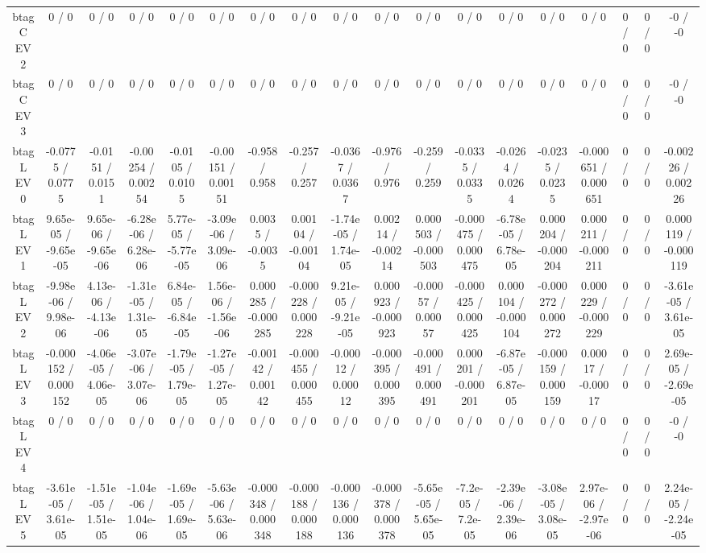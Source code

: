 \documentclass[10pt]{article}
\begin{document}
\begin{table}[htbp]
\begin{center}
\begin{tabular}{|c|c|c|c|c|c|c|c|c|c|c|c|c|c|c|c|c|c|}
  btag C EV 2 & 0 / 0 & 0 / 0 & 0 / 0 & 0 / 0 & 0 / 0 & 0 / 0 & 0 / 0 & 0 / 0 & 0 / 0 & 0 / 0 & 0 / 0 & 0 / 0 & 0 / 0 & 0 / 0 & 0 / 0 & 0 / 0 & -0 / -0 \\ 
  btag C EV 3 & 0 / 0 & 0 / 0 & 0 / 0 & 0 / 0 & 0 / 0 & 0 / 0 & 0 / 0 & 0 / 0 & 0 / 0 & 0 / 0 & 0 / 0 & 0 / 0 & 0 / 0 & 0 / 0 & 0 / 0 & 0 / 0 & -0 / -0 \\ 
  btag L EV 0 & -0.0775 / 0.0775 & -0.0151 / 0.0151 & -0.00254 / 0.00254 & -0.0105 / 0.0105 & -0.00151 / 0.00151 & -0.958 / 0.958 & -0.257 / 0.257 & -0.0367 / 0.0367 & -0.976 / 0.976 & -0.259 / 0.259 & -0.0335 / 0.0335 & -0.0264 / 0.0264 & -0.0235 / 0.0235 & -0.000651 / 0.000651 & 0 / 0 & 0 / 0 & -0.00226 / 0.00226 \\ 
  btag L EV 1 & 9.65e-05 / -9.65e-05 & 9.65e-06 / -9.65e-06 & -6.28e-06 / 6.28e-06 & 5.77e-05 / -5.77e-05 & -3.09e-06 / 3.09e-06 & 0.0035 / -0.0035 & 0.00104 / -0.00104 & -1.74e-05 / 1.74e-05 & 0.00214 / -0.00214 & 0.000503 / -0.000503 & -0.000475 / 0.000475 & -6.78e-05 / 6.78e-05 & 0.000204 / -0.000204 & 0.000211 / -0.000211 & 0 / 0 & 0 / 0 & 0.000119 / -0.000119 \\ 
  btag L EV 2 & -9.98e-06 / 9.98e-06 & 4.13e-06 / -4.13e-06 & -1.31e-05 / 1.31e-05 & 6.84e-05 / -6.84e-05 & 1.56e-06 / -1.56e-06 & 0.000285 / -0.000285 & -0.000228 / 0.000228 & 9.21e-05 / -9.21e-05 & 0.000923 / -0.000923 & -0.00057 / 0.00057 & -0.000425 / 0.000425 & 0.000104 / -0.000104 & -0.000272 / 0.000272 & 0.000229 / -0.000229 & 0 / 0 & 0 / 0 & -3.61e-05 / 3.61e-05 \\ 
  btag L EV 3 & -0.000152 / 0.000152 & -4.06e-05 / 4.06e-05 & -3.07e-06 / 3.07e-06 & -1.79e-05 / 1.79e-05 & -1.27e-05 / 1.27e-05 & -0.00142 / 0.00142 & -0.000455 / 0.000455 & -0.00012 / 0.00012 & -0.000395 / 0.000395 & -0.000491 / 0.000491 & 0.000201 / -0.000201 & -6.87e-05 / 6.87e-05 & -0.000159 / 0.000159 & 0.00017 / -0.00017 & 0 / 0 & 0 / 0 & 2.69e-05 / -2.69e-05 \\ 
  btag L EV 4 & 0 / 0 & 0 / 0 & 0 / 0 & 0 / 0 & 0 / 0 & 0 / 0 & 0 / 0 & 0 / 0 & 0 / 0 & 0 / 0 & 0 / 0 & 0 / 0 & 0 / 0 & 0 / 0 & 0 / 0 & 0 / 0 & -0 / -0 \\ 
  btag L EV 5 & -3.61e-05 / 3.61e-05 & -1.51e-05 / 1.51e-05 & -1.04e-06 / 1.04e-06 & -1.69e-05 / 1.69e-05 & -5.63e-06 / 5.63e-06 & -0.000348 / 0.000348 & -0.000188 / 0.000188 & -0.000136 / 0.000136 & -0.000378 / 0.000378 & -5.65e-05 / 5.65e-05 & -7.2e-05 / 7.2e-05 & -2.39e-06 / 2.39e-06 & -3.08e-05 / 3.08e-05 & 2.97e-06 / -2.97e-06 & 0 / 0 & 0 / 0 & 2.24e-05 / -2.24e-05 \\ 

\end{tabular}
\end{center}
\end{table}
\end{document}
